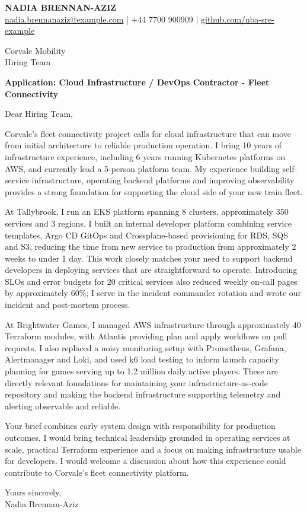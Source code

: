 \documentclass[11pt,a4paper]{article}
\begin{document}
{\Large\bfseries\color{primarycolor} NADIA BRENNAN-AZIZ}\\
{\small \href{mailto:nadia.brennanaziz@example.com}{nadia.brennanaziz@example.com} | +44 7700 900909 | \href{https://github.com/nba-sre-example}{github.com/nba-sre-example}}

Corvale Mobility\\
Hiring Team

\textbf{Application: Cloud Infrastructure / DevOps Contractor - Fleet Connectivity}

Dear Hiring Team,

Corvale's fleet connectivity project calls for cloud infrastructure that can move from initial architecture to reliable production operation. I bring 10 years of infrastructure experience, including 6 years running Kubernetes platforms on AWS, and currently lead a 5-person platform team. My experience building self-service infrastructure, operating backend platforms and improving observability provides a strong foundation for supporting the cloud side of your new train fleet.

At Tallybrook, I run an EKS platform spanning 8 clusters, approximately 350 services and 3 regions. I built an internal developer platform combining service templates, Argo CD GitOps and Crossplane-based provisioning for RDS, SQS and S3, reducing the time from new service to production from approximately 2 weeks to under 1 day. This work closely matches your need to support backend developers in deploying services that are straightforward to operate. Introducing SLOs and error budgets for 20 critical services also reduced weekly on-call pages by approximately 60\%; I serve in the incident commander rotation and wrote our incident and post-mortem process.

At Brightwater Games, I managed AWS infrastructure through approximately 40 Terraform modules, with Atlantis providing plan and apply workflows on pull requests. I also replaced a noisy monitoring setup with Prometheus, Grafana, Alertmanager and Loki, and used k6 load testing to inform launch capacity planning for games serving up to 1.2 million daily active players. These are directly relevant foundations for maintaining your infrastructure-as-code repository and making the backend infrastructure supporting telemetry and alerting observable and reliable.

Your brief combines early system design with responsibility for production outcomes. I would bring technical leadership grounded in operating services at scale, practical Terraform experience and a focus on making infrastructure usable for developers. I would welcome a discussion about how this experience could contribute to Corvale's fleet connectivity platform.

Yours sincerely,\\
Nadia Brennan-Aziz
\end{document}
